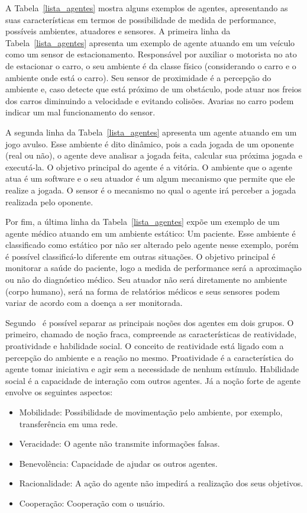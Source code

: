 A Tabela~\ref{lista_agentes} mostra alguns exemplos de agentes, apresentando as suas características em termos de possibilidade de medida de performance, possíveis ambientes, atuadores e sensores. A primeira linha da Tabela~\ref{lista_agentes} apresenta um exemplo de agente atuando em um veículo como um sensor de estacionamento. Responsável por auxiliar o motorista no ato de estacionar o carro, o seu ambiente é da classe físico (considerando o carro e o ambiente onde está o carro). Seu sensor de proximidade é a percepção do ambiente e, caso detecte que está próximo de um obstáculo, pode atuar nos freios dos carros diminuindo a velocidade e evitando colisões. Avarias no carro podem indicar um mal funcionamento do sensor.

A segunda linha da Tabela~\ref{lista_agentes} apresenta um agente atuando em um jogo avulso. Esse ambiente é dito dinâmico, pois a cada jogada de um oponente (real ou não), o agente deve analisar a jogada feita, calcular sua próxima jogada e executá-la. O objetivo principal do agente é a vitória. O ambiente que o agente atua é um software e o seu atuador é um algum mecanismo que permite que ele realize a jogada. O sensor é o mecanismo no qual o agente irá perceber a jogada realizada pelo oponente.

Por fim, a última linha da Tabela~\ref{lista_agentes} expõe um exemplo de um agente médico atuando em um ambiente estático: Um paciente. Esse ambiente é classificado como estático por não ser alterado pelo agente nesse exemplo, porém é possível classificá-lo diferente em outras situações. O objetivo principal é monitorar a saúde do paciente, logo a medida de performance será a aproximação ou não do diagnóstico médico. Seu atuador não será diretamente no ambiente (corpo humano), será na forma de relatórios médicos e seus sensores podem variar de acordo com a doença a ser monitorada.

Segundo~\cite{wooldridge04} é possível separar as principais noções dos agentes em dois grupos. O primeiro, chamado de noção fraca, compreende as características de reatividade, proatividade e habilidade social. O conceito de reatividade está ligado com a percepção do ambiente e a reação no mesmo. Proatividade é a característica do agente tomar iniciativa e agir sem a necessidade de nenhum estímulo. Habilidade social é a capacidade de interação com outros agentes. Já a noção forte de agente envolve os seguintes aspectos:

\begin{itemize}
	\item Mobilidade: Possibilidade de movimentação pelo ambiente, por exemplo, transferência em uma rede.
	\item Veracidade: O agente não transmite informações falsas.
	\item Benevolência: Capacidade de ajudar os outros agentes.
	\item Racionalidade: A ação do agente não impedirá a realização dos seus objetivos.
	\item Cooperação: Cooperação com o usuário.
\end{itemize}

